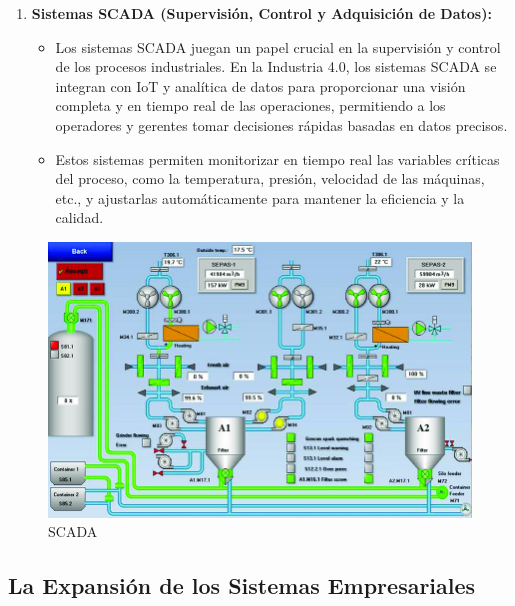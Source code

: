 \documentclass[
  10pt,
  letterpaper,
]{book}
\providecommand{\tightlist}{%
  \setlength{\itemsep}{0pt}\setlength{\parskip}{0pt}}\usepackage{longtable,booktabs,array}
\begin{document}
\begin{enumerate}
\def\labelenumi{\arabic{enumi}.}
\setcounter{enumi}{2}
\tightlist
\item
  \textbf{Sistemas SCADA (Supervisión, Control y Adquisición de Datos):}

  \begin{itemize}
  \tightlist
  \item
    Los sistemas SCADA juegan un papel crucial en la supervisión y
    control de los procesos industriales. En la Industria 4.0, los
    sistemas SCADA se integran con IoT y analítica de datos para
    proporcionar una visión completa y en tiempo real de las
    operaciones, permitiendo a los operadores y gerentes tomar
    decisiones rápidas basadas en datos precisos.
  \item
    Estos sistemas permiten monitorizar en tiempo real las variables
    críticas del proceso, como la temperatura, presión, velocidad de las
    máquinas, etc., y ajustarlas automáticamente para mantener la
    eficiencia y la calidad.
  \end{itemize}
\end{enumerate}

\begin{figure}[H]

{\centering \includegraphics{Img/scada.png}

}

\caption{SCADA}

\end{figure}%

\subsection{La Expansión de los Sistemas
Empresariales}\label{la-expansiuxf3n-de-los-sistemas-empresariales}
\end{document}
